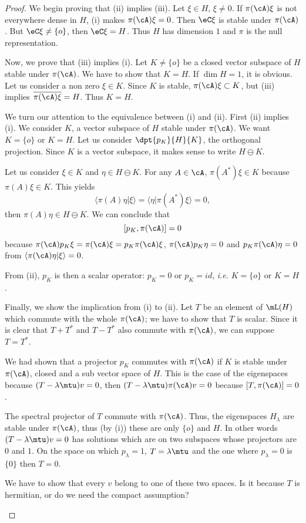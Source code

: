 \begin{proof}
	We begin proving that (ii) implies (iii). Let $\xi\in H$, $\xi\neq 0$.
	If $\pi(\cA)\xi$ is not everywhere dense in $H$, (i) makes
	$\pi(\cA)\xi=0$. Then $\eC\xi$ is stable under $\pi(\cA)$. But
	$\eC\xi\neq\{o\}$, then $\eC\xi=H$. Thus $H$ has dimension $1$ and $\pi$
	is the null representation.

	Now, we prove that (iii) implies (i). Let $K\neq\{o\}$ be a closed
	vector
	subspace of $H$ stable under $\pi(\cA)$. We have to show that $K=H$. If
	$\dim H=1$, it is obvious. Let us consider a non zero  $\xi\in K$. Since
	$K$ is stable, $\pi(\cA)\xi\subset K$, but (iii) implies
	$\overline{ \pi(\cA)\xi }=H$. Thus $K=H$.

	We turn our attention to the equivalence between (i) and (ii). First
	(ii) implies (i). We consider $K$, a vector subspace of $H$ stable under
	$\pi(\cA)$. We want $K=\{o\}$ or $K=H$. Let us consider
	$\dpt{p_K}{H}{K}$, the orthogonal projection. Since $K$ is a vector
	subspace, it makes sense to write $H\ominus K$.

	Let us consider $\xi\in K$ and $\eta\in H\ominus K$. For any $A\in\cA$,
	$\pi(A^*)\xi\in K$ because $\pi(A)\xi\in K$. This yields
	\[
		\langle \pi(A)\eta|\xi\rangle =\langle\eta|\pi(A^*)\xi\rangle=0,
	\]
	then $\pi(A)\eta\in H\ominus K$. We can conclude that
	\[
		[p_K,\pi(\cA)]=0
	\]
	because $\pi(\cA)p_K\xi=\pi(\cA)\xi=p_K\pi(\cA)\xi$, $\pi(\cA)p_K\eta=0$  and $p_K\pi(\cA)\eta=0$ from $\langle \pi(\cA)\eta|\xi\rangle =0$.

	From (ii), $p_K$ is then a scalar operator: $p_K=0$ or $p_K=id$, \emph{i.e.} $K=\{o\}$ or $K=H$.

	Finally, we show the implication from (i) to (ii). Let $T$ be an element of $\mL(H)$ which commute with the whole $\pi(\cA)$; we have to show that $T$ is scalar. Since it is clear that $T+T^*$ and $T-T^*$ also commute with $\pi(\cA)$, we can suppose $T=T^*$.

	We had shown that a projector $p_K$ commutes with $\pi(\cA)$ if $K$ is stable under $\pi(\cA)$, closed and a sub vector space of $H$. This is the case of the eigenspaces because $(T-\lambda\mtu)v=0$, then $(T-\lambda\mtu)\pi(\cA)v=0$ because $[T,\pi(\cA)]=0$.

	The spectral projector of $T$ commute with $\pi(\cA)$. Thus, the eigenspaces $H_{\lambda}$ are stable under $\pi(\cA)$, thus (by (i)) these are only $\{o\}$ and $H$. In other words $(T-\lambda\mtu)v=0$ has solutions which are on two subspaces whose projectors are $0$ and $1$. On the space on which $p_{\lambda}=1$, $T=\lambda\mtu$ and the one where $p_{\lambda}=0$ is $\{0\}$ then $T=0$.

	\begin{probleme}
		We have to show that every $v$ belong to one of these two spaces. Is it because $T$ is hermitian, or do we need the compact assumption?
	\end{probleme}

\end{proof}

